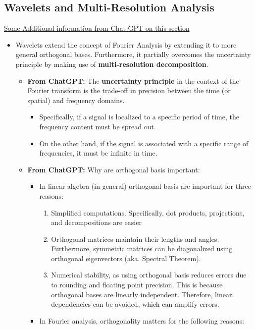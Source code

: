 \documentclass[11.5pt,a4paper]{article}
\begin{document}
\subsection*{Wavelets and Multi-Resolution Analysis}
\href{https://chatgpt.com/c/683210e2-ed70-800a-ab69-dfbfabae2915}{Some Additional information from Chat GPT on this section}
\begin{itemize}
    \item Wavelets extend the concept of Fourier Analysis by extending it to more general orthogonal bases. Furthermore, it partially overcomes the uncertainty principle by making use of \textbf{multi-resolution decomposition}.
    \begin{itemize}
        \item \textbf{From ChatGPT:} The \textbf{uncertainty principle} in the context of the Fourier transform is the trade-off in precision between the time (or spatial) and frequency domains. 
        \begin{itemize}
            \item Specifically, if a signal is localized to a specific period of time, the frequency content must be spread out.  
            \item On the other hand, if the signal is associated with a specific range of frequencies, it must be infinite in time.
        \end{itemize}
        \item \textbf{From ChatGPT:} Why are orthogonal basis important:
        \begin{itemize}
            \item In linear algebra (in general) orthogonal basis are important for three reasons:
            \begin{enumerate}
                \item Simplified computations. Specifically, dot products, projections, and decompositions are easier
                \item Orthogonal matrices maintain their lengths and angles. Furthermore, symmetric matrices can be diagonalized using orthogonal eigenvectors (aka. Spectral Theorem).
                \item Numerical stability, as using orthogonal basis reduces errors due to rounding and floating point precision. This is because orthogonal bases are linearly independent. Therefore, linear dependencies can be avoided, which can amplify errors.
            \end{enumerate}
            \item In Fourier analysis, orthogonality matters for the following reasons:

\end{itemize}
\end{itemize}
\end{itemize}
\end{document}
